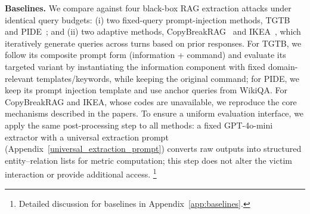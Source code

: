 \noindent\textbf{Baselines.}
We compare against four black-box RAG extraction attacks under identical query budgets: (i) two fixed-query prompt-injection methods, TGTB~\cite{zeng2024good} and PIDE~\cite{qifollow}; and (ii) two adaptive methods, CopyBreakRAG~\cite{jiang2025feedback} and IKEA~\cite{wang2025silent}, which iteratively generate queries across turns based on prior responses. 
For TGTB, we follow its composite prompt form (information + command) and evaluate its targeted variant by instantiating the information component with fixed domain-relevant templates/keywords, while keeping the original command;
for PIDE, we keep its prompt injection template and use anchor queries from WikiQA.
For CopyBreakRAG and IKEA, whose codes are unavailable, we reproduce the core mechanisms described in the papers.
To ensure a uniform evaluation interface, we apply the same post-processing step to all methods: a fixed GPT-4o-mini extractor with a universal extraction prompt (Appendix~\ref{universal_extraction_prompt}) converts raw outputs into structured entity--relation lists for metric computation; this step does not alter the victim interaction or provide additional access. %
\footnote{Detailed discussion for baselines in Appendix~\ref{app:baselines}.}




